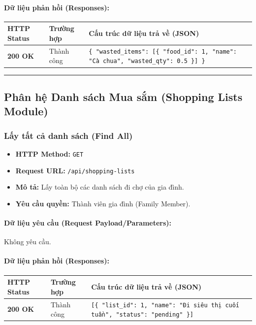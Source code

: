\documentclass[12pt,a4paper]{article}
\begin{document}
\paragraph{Dữ liệu phản hồi (Responses):}
\begin{longtable}{|>{\raggedright\arraybackslash}p{2.8cm}|>{\raggedright\arraybackslash}p{3.2cm}|>{\raggedright\arraybackslash}p{8.0cm}|}
\hline
\textbf{HTTP Status} & \textbf{Trường hợp} & \textbf{Cấu trúc dữ liệu trả về (JSON)} \\ \hline
\endhead
\textbf{200 OK} & Thành công & \texttt{\{ "wasted\_items": [\{ "food\_id": 1, "name": "Cà chua", "wasted\_qty": 0.5 \}] \}} \\ \hline
\end{longtable}

\vskip 0.4cm
\noindent\rule{\textwidth}{0.3pt}
\vskip 0.4cm

\subsection{Phân hệ Danh sách Mua sắm (Shopping Lists Module)}

\subsubsection{Lấy tất cả danh sách (Find All)}
\begin{itemize}[leftmargin=*]
    \item \textbf{HTTP Method:} \texttt{GET}
    \item \textbf{Request URL:} \texttt{/api/shopping-lists}
    \item \textbf{Mô tả:} Lấy toàn bộ các danh sách đi chợ của gia đình.
    \item \textbf{Yêu cầu quyền:} Thành viên gia đình (Family Member).
\end{itemize}

\paragraph{Dữ liệu yêu cầu (Request Payload/Parameters):}
Không yêu cầu.\\

\paragraph{Dữ liệu phản hồi (Responses):}
\begin{longtable}{|>{\raggedright\arraybackslash}p{2.8cm}|>{\raggedright\arraybackslash}p{3.2cm}|>{\raggedright\arraybackslash}p{8.0cm}|}
\hline
\textbf{HTTP Status} & \textbf{Trường hợp} & \textbf{Cấu trúc dữ liệu trả về (JSON)} \\ \hline
\endhead
\textbf{200 OK} & Thành công & \texttt{[\{ "list\_id": 1, "name": "Đi siêu thị cuối tuần", "status": "pending" \}]} \\ \hline
\end{longtable}
\end{document}
